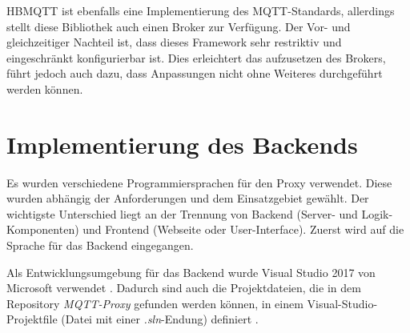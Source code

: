     HBMQTT ist ebenfalls eine Implementierung des \ac{MQTT}-Standards, allerdings stellt diese Bibliothek auch einen Broker zur Verfügung. Der Vor- und gleichzeitiger Nachteil ist, dass dieses Framework sehr restriktiv und eingeschränkt konfigurierbar ist. Dies erleichtert das aufzusetzen des Brokers, führt jedoch auch dazu, dass Anpassungen nicht ohne Weiteres durchgeführt werden können. \cite{jouanin_2018}
    
\section{Implementierung des Backends}

    Es wurden verschiedene Programmiersprachen für den Proxy verwendet. Diese wurden abhängig der Anforderungen und dem Einsatzgebiet gewählt.
    Der wichtigste Unterschied liegt an der Trennung von Backend (Server- und Logik- Komponenten) und Frontend (Webseite oder User-Interface).
    Zuerst wird auf die Sprache für das Backend eingegangen.
    
    Als Entwicklungsumgebung für das Backend wurde Visual Studio 2017 von Microsoft verwendet \cite{microsoft_2019}. Dadurch sind auch die Projektdateien, die in dem Repository \emph{MQTT-Proxy} gefunden werden können, in einem Visual-Studio-Projektfile (Datei mit einer \emph{.sln}-Endung) definiert \cite{eisenschmidt_2019}.
    
